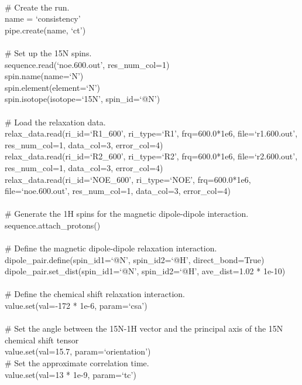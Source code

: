 \begin{exampleenv}
 \\
\# Create the run. \\
name = `consistency' \\
pipe.create(name, `ct') \\
 \\
\# Set up the 15N spins. \\
sequence.read(`noe.600.out', res\_num\_col=1) \\
spin.name(name=`N') \\
spin.element(element=`N') \\
spin.isotope(isotope=`15N', spin\_id=`@N') \\
 \\
\# Load the relaxation data. \\
relax\_data.read(ri\_id=`R1\_600',  ri\_type=`R1',  frq=600.0*1e6, file=`r1.600.out',  res\_num\_col=1, data\_col=3, error\_col=4) \\
relax\_data.read(ri\_id=`R2\_600',  ri\_type=`R2',  frq=600.0*1e6, file=`r2.600.out',  res\_num\_col=1, data\_col=3, error\_col=4) \\
relax\_data.read(ri\_id=`NOE\_600', ri\_type=`NOE', frq=600.0*1e6, file=`noe.600.out', res\_num\_col=1, data\_col=3, error\_col=4) \\
 \\
\# Generate the 1H spins for the magnetic dipole-dipole interaction. \\
sequence.attach\_protons() \\
 \\
\# Define the magnetic dipole-dipole relaxation interaction. \\
dipole\_pair.define(spin\_id1=`@N', spin\_id2=`@H', direct\_bond=True) \\
dipole\_pair.set\_dist(spin\_id1=`@N', spin\_id2=`@H', ave\_dist=1.02 * 1e-10) \\
 \\
\# Define the chemical shift relaxation interaction. \\
value.set(val=-172 * 1e-6, param=`csa') \\
 \\
\# Set the angle between the 15N-1H vector and the principal axis of the 15N chemical shift tensor \\
value.set(val=15.7, param=`orientation') 
 \\
\# Set the approximate correlation time. \\
value.set(val=13 * 1e-9, param=`tc') \\
 \\

\end{exampleenv}
